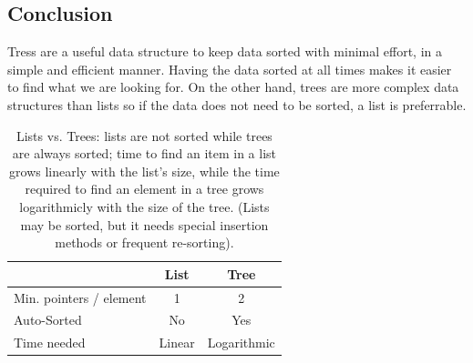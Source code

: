 \subsection{Conclusion}
\label{sec:conclusion}

Tress are a useful data structure to keep data sorted with minimal
effort, in a simple and efficient manner. Having the data sorted at
all times makes it easier to find what we are looking for. On the
other hand, trees are more complex data structures than lists
so if the data does not need to be sorted, a list is preferrable. 

\begin{table}[hbtp]
  \centering
  \begin{tabular}{|l|c|c|}
    \hline
    & List & Tree \\
    \hline
    Min. pointers / element & 1 & 2 \\
    Auto-Sorted & No & Yes \\
    Time needed & Linear & Logarithmic \\
    \hline
  \end{tabular}
  \caption{Lists vs. Trees: lists are not sorted 
    while trees are always sorted; time to find an item in a list grows
    linearly with the list's size, while the time required to find an
    element in a tree grows logarithmicly with the size of the tree. 
    (Lists may be sorted, but it needs special insertion methods or
    frequent re-sorting). 
  }
  \label{tab:treelist}
\end{table}


